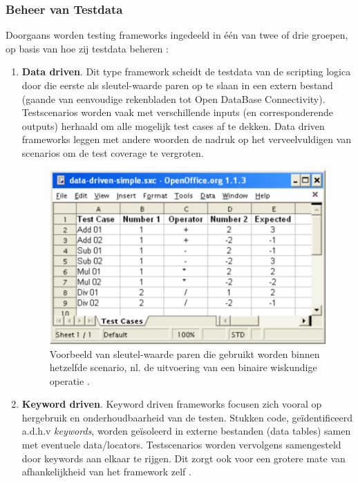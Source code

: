 \subsubsection{Beheer van Testdata}

Doorgaans worden testing frameworks ingedeeld in één van twee of drie groepen, op basis van hoe zij testdata beheren \autocite{Day2014} \autocite{Laukkanen2006}:

\begin{enumerate}
    \item \textbf{Data driven}. Dit type framework scheidt de testdata van de scripting logica door die eerste als sleutel-waarde paren op te slaan in een extern bestand (gaande van eenvoudige rekenbladen tot Open DataBase Connectivity). Testscenarios worden vaak met verschillende inputs (en corresponderende outputs) herhaald om alle mogelijk test cases af te dekken. Data driven frameworks leggen met andere woorden de nadruk op het verveelvuldigen van scenarios om de test coverage te vergroten.
    \begin{figure}[h!]
        \centering
        \includegraphics[scale=0.4]{img/Laukkanen2006DataDriven.PNG}
        \caption{Voorbeeld van sleutel-waarde paren die gebruikt worden binnen hetzelfde scenario, nl. de uitvoering van een binaire wiskundige operatie \autocite{Laukkanen2006}.}
        \label{fig:laukkanendatadriven}
    \end{figure}
    \item \textbf{Keyword driven}. Keyword driven frameworks focusen zich vooral op hergebruik en onderhoudbaarheid van de testen. Stukken code, geïdentificeerd a.d.h.v \emph{keywords}, worden geïsoleerd in externe bestanden (data tables) samen met eventuele data/locators. Testscenarios worden vervolgens samengesteld door keywords aan elkaar te rijgen. Dit zorgt ook voor een grotere mate van afhankelijkheid van het framework zelf \autocite{Madan2013}.

\end{enumerate}
